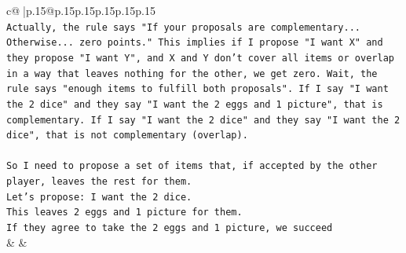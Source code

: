 \documentclass{article}
\begin{document}
{\begin{supertabular}{c@{$\;$}|p{.15\linewidth}@{}p{.15\linewidth}p{.15\linewidth}p{.15\linewidth}p{.15\linewidth}p{.15\linewidth}}
{{{\\ 
\texttt{Actually, the rule says "If your proposals are complementary... Otherwise... zero points." This implies if I propose "I want X" and they propose "I want Y", and X and Y don't cover all items or overlap in a way that leaves nothing for the other, we get zero. Wait, the rule says "enough items to fulfill both proposals". If I say "I want the 2 dice" and they say "I want the 2 eggs and 1 picture", that is complementary. If I say "I want the 2 dice" and they say "I want the 2 dice", that is not complementary (overlap).} \\
\\ 
\texttt{So I need to propose a set of items that, if accepted by the other player, leaves the rest for them.} \\
\texttt{Let's propose: I want the 2 dice.} \\
\texttt{This leaves 2 eggs and 1 picture for them.} \\
\texttt{If they agree to take the 2 eggs and 1 picture, we succeed} \\
            }
        }
    }
    & & \\ \\


\end{supertabular}}
\end{document}
